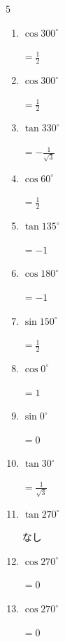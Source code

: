 \begin{multicols}{5}
\begin{enumerate}
        $\displaystyle =\sqrt{3}$

  \item $\displaystyle \cos{300^\circ}$

        $\displaystyle =\frac{1}{2}$

  \item $\displaystyle \cos{300^\circ}$

        $\displaystyle =\frac{1}{2}$

  \item $\displaystyle \tan{330^\circ}$

        $\displaystyle =-\frac{1}{\sqrt{3}}$

  \item $\displaystyle \cos{60^\circ}$

        $\displaystyle =\frac{1}{2}$

  \item $\displaystyle \tan{135^\circ}$

        $\displaystyle =-1$

  \item $\displaystyle \cos{180^\circ}$

        $\displaystyle =-1$

  \item $\displaystyle \sin{150^\circ}$

        $\displaystyle =\frac{1}{2}$

  \item $\displaystyle \cos{0^\circ}$

        $\displaystyle =1$

  \item $\displaystyle \sin{0^\circ}$

        $\displaystyle =0$

  \item $\displaystyle \tan{30^\circ}$

        $\displaystyle =\frac{1}{\sqrt{3}}$

  \item $\displaystyle \tan{270^\circ}$

        $\displaystyle なし$

  \item $\displaystyle \cos{270^\circ}$

        $\displaystyle =0$

  \item $\displaystyle \cos{270^\circ}$

        $\displaystyle =0$


\end{enumerate}
\end{multicols}
